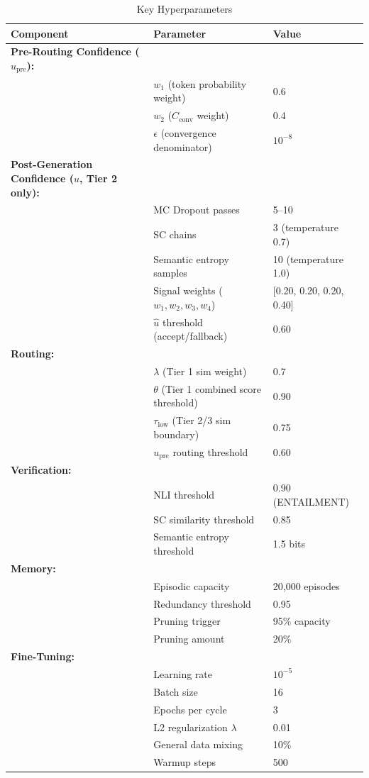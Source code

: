 \documentclass[12pt,a4paper]{article}
\theoremstyle{definition}
\newcommand{\upre}{u_{\text{pre}}}
\newcommand{\uhat}{\hat{u}}
\newcommand{\Cconv}{C_{\text{conv}}}
\begin{document}
\begin{table}[htbp]
\centering
\caption{Key Hyperparameters}
\begin{tabular}{lll}
\toprule
\textbf{Component} & \textbf{Parameter} & \textbf{Value} \\
\midrule
\textbf{Pre-Routing Confidence ($\upre$):} & & \\
& $w_1$ (token probability weight) & 0.6 \\
& $w_2$ ($\Cconv$ weight) & 0.4 \\
& $\epsilon$ (convergence denominator) & $10^{-8}$ \\
\midrule
\textbf{Post-Generation Confidence ($\uhat$, Tier 2 only):} & & \\
& MC Dropout passes & 5--10 \\
& SC chains & 3 (temperature 0.7) \\
& Semantic entropy samples & 10 (temperature 1.0) \\
& Signal weights ($w_1, w_2, w_3, w_4$) & [0.20, 0.20, 0.20, 0.40] \\
& $\uhat$ threshold (accept/fallback) & 0.60 \\
\midrule
\textbf{Routing:} & & \\
& $\lambda$ (Tier 1 sim weight) & 0.7 \\
& $\theta$ (Tier 1 combined score threshold) & 0.90 \\
& $\tau_{\text{low}}$ (Tier 2/3 sim boundary) & 0.75 \\
& $\upre$ routing threshold & 0.60 \\
\midrule
\textbf{Verification:} & & \\
& NLI threshold & 0.90 (ENTAILMENT) \\
& SC similarity threshold & 0.85 \\
& Semantic entropy threshold & 1.5 bits \\
\midrule
\textbf{Memory:} & & \\
& Episodic capacity & 20,000 episodes \\
& Redundancy threshold & 0.95 \\
& Pruning trigger & 95\% capacity \\
& Pruning amount & 20\% \\
\midrule
\textbf{Fine-Tuning:} & & \\
& Learning rate & $10^{-5}$ \\
& Batch size & 16 \\
& Epochs per cycle & 3 \\
& L2 regularization $\lambda$ & 0.01 \\
& General data mixing & 10\% \\
& Warmup steps & 500 \\
\bottomrule
\end{tabular}
\end{table}
\end{document}
